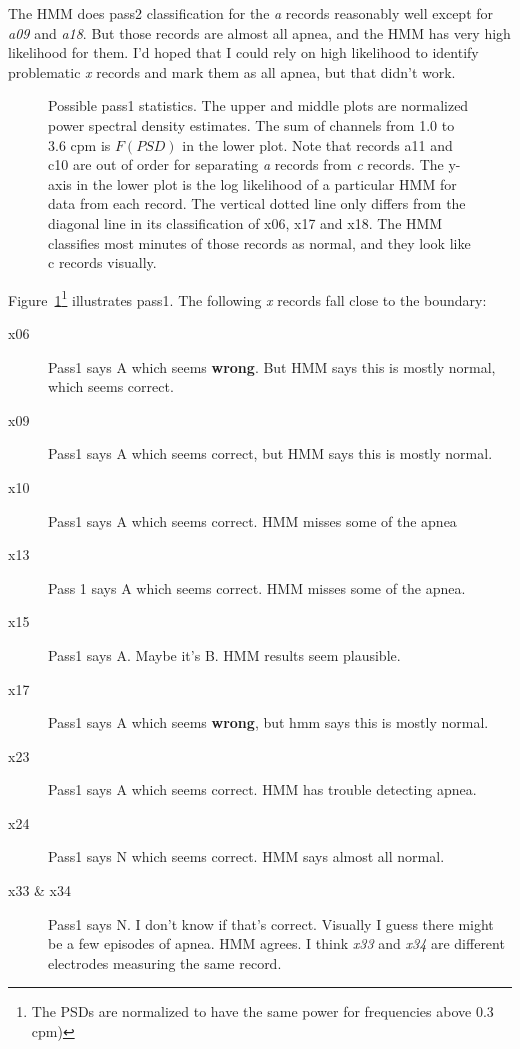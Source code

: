 \documentclass[12pt]{article}
\begin{document}
The HMM does pass2 classification for the \emph{a} records reasonably
well except for \emph{a09} and \emph{a18}.  But those records are
almost all apnea, and the HMM has very high likelihood for them.  I'd
hoped that I could rely on high likelihood to identify problematic
\emph{x} records and mark them as all apnea, but that didn't work.

\begin{figure}
  \centering
    \caption{Possible pass1 statistics.  The upper and middle plots
      are normalized power spectral density estimates.  The sum of
      channels from 1.0 to 3.6 cpm is $F(PSD)$ in the lower plot.
      Note that records a11 and c10 are out of order for separating
      \emph{a} records from \emph{c} records.  The y-axis in the lower
      plot is the log likelihood of a particular HMM for data from
      each record.  The vertical dotted line only differs from the
      diagonal line in its classification of x06, x17 and x18.  The
      HMM classifies most minutes of those records as normal, and they
      look like c records visually.}
  \label{fig:statistics}
\end{figure}

Figure~\ref{fig:statistics}\footnote{The PSDs are normalized to have
  the same power for frequencies above 0.3 cpm)} illustrates pass1.
  The following \emph{x} records fall close to the boundary:
\begin{description}
\item[x06] Pass1 says A which seems \textbf{wrong}.  But HMM says this
  is mostly normal, which seems correct.
\item[x09] Pass1 says A which seems correct, but HMM says this is
  mostly normal.
\item[x10] Pass1 says A which seems correct.  HMM misses some of the
  apnea
\item[x13] Pass 1 says A which seems correct.  HMM misses some of the
  apnea.
\item[x15] Pass1 says A.  Maybe it's B.  HMM results seem plausible.
\item[x17] Pass1 says A which seems \textbf{wrong}, but hmm says this
  is mostly normal.
\item[x23] Pass1 says A which seems correct.  HMM has trouble
  detecting apnea.
\item[x24] Pass1 says N which seems correct.  HMM says almost all
  normal.
\item[x33 \& x34] Pass1 says N.  I don't know if that's correct.
  Visually I guess there might be a few episodes of apnea.  HMM
  agrees.  I think \emph{x33} and \emph{x34} are different electrodes
  measuring the same record.
\end{description}
\end{document}
